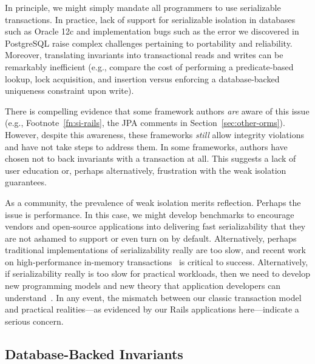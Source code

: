 In principle, we might simply mandate all programmers to use
serializable transactions. In practice, lack of support for
serializable isolation in databases such as Oracle 12c and
implementation bugs such as the error we discovered in PostgreSQL
raise complex challenges pertaining to portability and
reliability. Moreover, translating invariants into transactional reads and writes
can be remarkably inefficient (e.g., compare the cost of performing a
predicate-based lookup, lock acquisition, and insertion versus
enforcing a database-backed uniqueness constraint upon write).

There is compelling evidence that some framework authors \textit{are}
aware of this issue (e.g., Footnote~\ref{fn:si-rails}, the JPA
comments in Section~\ref{sec:other-orms}). However, despite this
awareness, these frameworks \textit{still} allow integrity violations
and have not take steps to address them. In some frameworks, authors
have chosen not to back invariants with a transaction at all. This
suggests a lack of user education or, perhaps alternatively,
frustration with the weak isolation guarantees.

As a community, the prevalence of weak isolation merits
reflection. Perhaps the issue is performance. In this case, we might
develop benchmarks to encourage vendors and open-source applications
into delivering fast serializability that they are not ashamed to
support or even turn on by default. Alternatively, perhaps traditional
implementations of serializability really are too slow, and recent
work on high-performance in-memory transactions~\cite{hekaton,hstore}
is critical to success. Alternatively, if serializability really
is too slow for practical workloads, then we need to develop new
programming models and new theory that application developers can
understand~\cite{coord-avoid,calm,redblue-new,writes-forest}. In any
event, the mismatch between our classic transaction model and
practical realities---as evidenced by our Rails applications
here---indicate a serious concern.

\subsection{Database-Backed Invariants}

